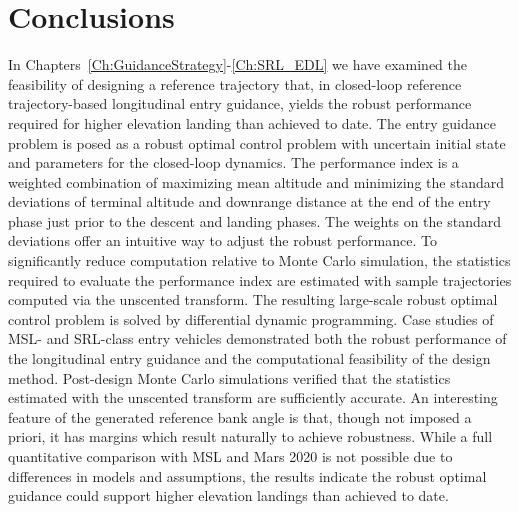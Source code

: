 \chapter{Conclusions}\label{Ch:Conclusions}


In Chapters~\ref{Ch:GuidanceStrategy}-\ref{Ch:SRL_EDL} we have examined the feasibility of designing a reference trajectory that, in closed-loop reference trajectory-based longitudinal entry guidance, yields the robust performance required for higher elevation landing than achieved to date. The entry guidance problem is posed as a robust optimal control problem with uncertain initial state and parameters for the closed-loop dynamics. The performance index is a weighted combination of maximizing mean altitude and minimizing the standard deviations of terminal altitude and downrange distance at the end of the entry phase just prior to the descent and landing phases. The weights on the standard deviations offer an intuitive way to adjust the robust performance. To significantly reduce computation relative to Monte Carlo simulation, the statistics required to evaluate the performance index are estimated with sample trajectories computed via the unscented transform. The resulting large-scale robust optimal control problem is solved by differential dynamic programming. Case studies of MSL- and SRL-class entry vehicles demonstrated both the robust performance of the longitudinal entry guidance and the computational feasibility of the design method. Post-design Monte Carlo simulations verified that the statistics estimated with the unscented transform are sufficiently accurate. An interesting feature of the generated reference bank angle is that, though not imposed a priori, it has margins which result naturally to achieve robustness. While a full quantitative comparison with MSL and Mars 2020 is not possible due to differences in models and assumptions, the results indicate the robust optimal guidance could support higher elevation landings than achieved to date.

